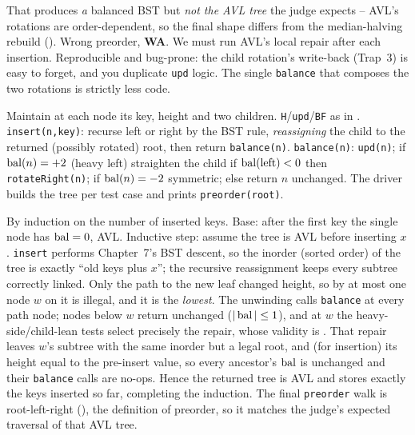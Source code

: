 \begin{thinkbox}
{That produces \emph{a} balanced BST but \emph{not the AVL tree} the judge expects -- AVL's rotations are
order-dependent, so the final shape differs from the median-halving rebuild (). Wrong
preorder, \textbf{WA}. We must run AVL's local repair after each insertion.}
{Reproducible and bug-prone: the child rotation's write-back (Trap~3) is easy to forget, and you duplicate
\texttt{upd} logic. The single \texttt{balance} that composes the two rotations is strictly less code.}
\end{thinkbox}

Maintain at each node its key, height and two children. \texttt{H}/\texttt{upd}/\texttt{BF} as in
. \texttt{insert(n,key)}: recurse left or right by the BST rule, \emph{reassigning}
the child to the returned (possibly rotated) root, then return \texttt{balance(n)}. \texttt{balance(n)}:
\texttt{upd(n)}; if $\operatorname{bal}(n)=+2$ (heavy left) straighten the child if $\operatorname{bal}(\text{left})<0$ then
\texttt{rotateRight(n)}; if $\operatorname{bal}(n)=-2$ symmetric; else return $n$ unchanged. The driver builds the tree
per test case and prints \texttt{preorder(root)}.

\begin{proofbox}
By induction on the number of inserted keys. Base: after the first key the single node has $\operatorname{bal}=0$, AVL.
Inductive step: assume the tree is AVL before inserting $x$. \texttt{insert} performs Chapter~7's BST
descent, so the inorder (sorted order) of the tree is exactly ``old keys plus $x$''; the recursive
reassignment keeps every subtree correctly linked. Only the path to the new leaf changed height, so by
 at most one node $w$ on it is illegal, and it is the \emph{lowest}. The unwinding
calls \texttt{balance} at every path node; nodes below $w$ return unchanged ($|\operatorname{bal}|\le1$), and at $w$ the
heavy-side/child-lean tests select precisely the  repair, whose validity is
. That repair leaves $w$'s subtree with the same inorder but a legal root, and (for
insertion) its height equal to the pre-insert value, so every ancestor's $\operatorname{bal}$ is unchanged and their
\texttt{balance} calls are no-ops. Hence the returned tree is AVL and stores exactly the keys inserted so
far, completing the induction. The final \texttt{preorder} walk is root-left-right (), the
definition of preorder, so it matches the judge's expected traversal of that AVL tree. \end{proofbox}


